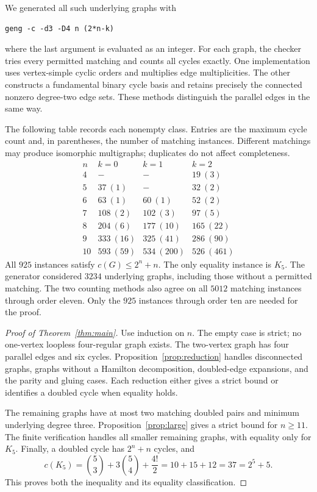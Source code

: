 \documentclass[11pt]{article}
\begin{document}
We generated all such underlying graphs with
\begin{verbatim}
geng -c -d3 -D4 n (2*n-k)
\end{verbatim}
where the last argument is evaluated as an integer.
For each graph, the checker tries every permitted matching and counts all cycles exactly.
One implementation uses vertex-simple cyclic orders and multiplies edge multiplicities.
The other constructs a fundamental binary cycle basis and retains precisely the connected nonzero degree-two edge sets.
These methods distinguish the parallel edges in the same way.

The following table records each nonempty class.
Entries are the maximum cycle count and, in parentheses, the number of matching instances.
Different matchings may produce isomorphic multigraphs; duplicates do not affect completeness.
\[
\begin{array}{c|rrr}
 n&k=0&k=1&k=2\\\hline
 4&-&-&19\ (3)\\
 5&37\ (1)&-&32\ (2)\\
 6&63\ (1)&60\ (1)&52\ (2)\\
 7&108\ (2)&102\ (3)&97\ (5)\\
 8&204\ (6)&177\ (10)&165\ (22)\\
 9&333\ (16)&325\ (41)&286\ (90)\\
 10&593\ (59)&534\ (200)&526\ (461)
\end{array}
\]
All $925$ instances satisfy $c(G)\le2^n+n$.
The only equality instance is $K_5$.
The generator considered $3234$ underlying graphs, including those without a permitted matching.
The two counting methods also agree on all $5012$ matching instances through order eleven.
Only the $925$ instances through order ten are needed for the proof.

\begin{proof}[Proof of Theorem~\ref{thm:main}]
Use induction on $n$.
The empty case is strict; no one-vertex loopless four-regular graph exists.
The two-vertex graph has four parallel edges and six cycles.
Proposition~\ref{prop:reduction} handles disconnected graphs, graphs without a Hamilton decomposition,
doubled-edge expansions, and the parity and gluing cases.
Each reduction either gives a strict bound or identifies a doubled cycle when equality holds.

The remaining graphs have at most two matching doubled pairs and minimum underlying degree three.
Proposition~\ref{prop:large} gives a strict bound for $n\ge11$.
The finite verification handles all smaller remaining graphs, with equality only for $K_5$.
Finally, a doubled cycle has $2^n+n$ cycles, and
\[
 c(K_5)=\binom53+3\binom54+\frac{4!}{2}=10+15+12=37=2^5+5.
\]
This proves both the inequality and its equality classification.
\end{proof}
\end{document}
